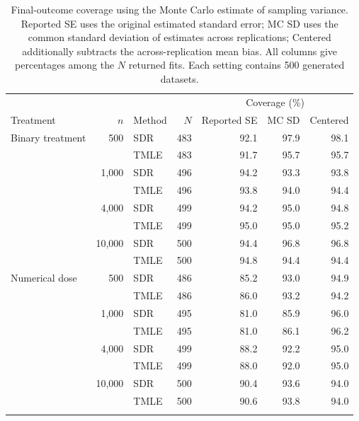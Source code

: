 \begin{table}[htbp]
\centering\small
\setlength{\tabcolsep}{6pt}
\caption{Final-outcome coverage using the Monte Carlo estimate of sampling variance. Reported SE uses the original estimated standard error; MC SD uses the common standard deviation of estimates across replications; Centered additionally subtracts the across-replication mean bias. All columns give percentages among the $N$ returned fits. Each setting contains 500 generated datasets.}
\label{tab:sim-mc-variance}
\begin{tabular}{lrlrrrr}
\toprule
& & & & \multicolumn{3}{c}{Coverage (\%)}\\
Treatment & $n$ & Method & $N$ & Reported SE & MC SD & Centered\\
\midrule
Binary treatment & 500 & SDR & 483 & 92.1 & 97.9 & 98.1\\
 &  & TMLE & 483 & 91.7 & 95.7 & 95.7\\
\addlinespace[2pt]
 & 1,000 & SDR & 496 & 94.2 & 93.3 & 93.8\\
 &  & TMLE & 496 & 93.8 & 94.0 & 94.4\\
\addlinespace[2pt]
 & 4,000 & SDR & 499 & 94.2 & 95.0 & 94.8\\
 &  & TMLE & 499 & 95.0 & 95.0 & 95.2\\
\addlinespace[2pt]
 & 10,000 & SDR & 500 & 94.4 & 96.8 & 96.8\\
 &  & TMLE & 500 & 94.8 & 94.4 & 94.4\\
\addlinespace[2pt]
\midrule
Numerical dose & 500 & SDR & 486 & 85.2 & 93.0 & 94.9\\
 &  & TMLE & 486 & 86.0 & 93.2 & 94.2\\
\addlinespace[2pt]
 & 1,000 & SDR & 495 & 81.0 & 85.9 & 96.0\\
 &  & TMLE & 495 & 81.0 & 86.1 & 96.2\\
\addlinespace[2pt]
 & 4,000 & SDR & 499 & 88.2 & 92.2 & 95.0\\
 &  & TMLE & 499 & 88.0 & 92.0 & 95.0\\
\addlinespace[2pt]
 & 10,000 & SDR & 500 & 90.4 & 93.6 & 94.0\\
 &  & TMLE & 500 & 90.6 & 93.8 & 94.0\\
\addlinespace[2pt]
\bottomrule
\end{tabular}
\end{table}

